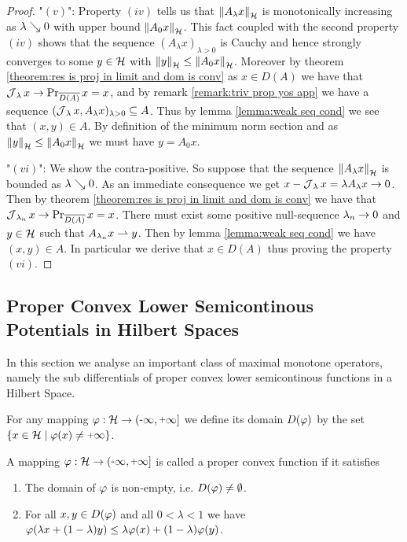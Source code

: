 \begin{proof}
	"$(v)$": Property $ (iv) $ tells us that $ \left\Vert A_\lambda x\right\Vert_{\mathcal{H}} $
	is monotonically increasing as $ \lambda\searrow 0 $ with upper
	bound $ \left\Vert A_0 x\right\Vert_{\mathcal{H}} $. This fact coupled with the second
	property $ (iv) $ shows that the sequence $ (A_\lambda x)_{\lambda>0} $ is
	Cauchy and hence strongly converges to some $ y\in\mathcal{H} $
	with $ \left\Vert y\right\Vert_{\mathcal{H}}\leq \left\Vert A_0 x\right\Vert_{\mathcal{H}} $.
	Moreover by theorem
	\ref{theorem:res is proj in limit and dom is conv}
	as $ x\in D(A) $ we have that $ \operatorname{\mathcal{J}}_\lambda x\rightarrow \operatorname{\mathrm{Pr}}_{\overline{D(A)}} x =x$,
	and by remark \ref{remark:triv prop yos app} we have a sequence 
	$ (\operatorname{\mathcal{J}}_\lambda x,A_\lambda x)_{\lambda >0}\subseteq A $.
	Thus by lemma \ref{lemma:weak seq cond} we see that $ (x,y)\in A $.
	By definition of the minimum norm section and as $ \left\Vert y\right\Vert_{\mathcal{H}}\leq \left\Vert A_0 x\right\Vert_{\mathcal{H}} $
	we must have $ y=A_0 x $.\medskip
	
	"$ (vi) $": We show the contra-positive. So suppose that the
	sequence $ \left\Vert A_\lambda x\right\Vert_{\mathcal{H}} $ is bounded as $ \lambda \searrow 0 $.
	As an immediate consequence we get
	 $ x-\operatorname{\mathcal{J}}_\lambda x=\lambda A_\lambda x\rightarrow 0 $.
	 Then by theorem \ref{theorem:res is proj in limit and dom is conv} 
	 we have that $ \operatorname{\mathcal{J}}_{\lambda_n} x \rightarrow \operatorname{\mathrm{Pr}}_{\overline{D(A)}} x=x$.
	There must exist some positive null-sequence $ \lambda_n\rightarrow 0 $
	and $ y\in\mathcal{H} $ such that $ A_{\lambda_n} x\rightharpoonup y $. 
	Then by lemma \ref{lemma:weak seq cond}
	we have $ (x,y)\in A $.
	In particular we derive that $ x\in D(A) $ thus proving the property $ (vi) $.
\end{proof}

\subsection{Proper Convex Lower Semicontinous Potentials in Hilbert Spaces}

In this section we analyse an important class of maximal monotone operators,
namely the sub differentials of proper convex lower semicontinous
functions in a Hilbert Space.\medskip

For any mapping $ \varphi:\rH \ra \eRR $ we define its domain $ D(\varphi) $
by the set $ \{x\in\rH\sep\vp(x)\neq\plus\infty \} $.

\begin{definition}
	A mapping $ \varphi:\rH \ra \eRR $ is called a proper convex function 
	if it satisfies
	\begin{enumerate}[label=(\roman*)]
		\item The domain of $ \varphi $ is non-empty, i.e. $ D(\varphi)\neq\emptyset $.
		\item For all $ x,y\in D(\varphi) $ 
		and all $ 0<\lambda<1 $ we have 
		$ \varphi(\lambda x+(1-\lambda)y)\leq \lambda\varphi(x)+(1-\lambda)\varphi(y) $.
	\end{enumerate}
\end{definition}

